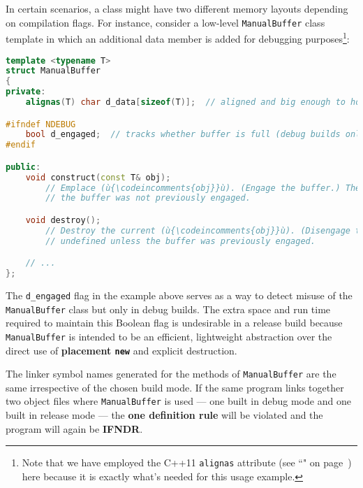 In certain scenarios, a class might have two different memory layouts
depending on compilation flags. For instance, consider a low-level
\texttt{ManualBuffer} class template in which an additional data member
is added for debugging purposes{\cprotect\footnote{Note that we have
  employed the C++11 \texttt{alignas} attribute (see ``" on page~\pageref{alignas}) here
  because it is exactly what's needed for this usage example.}}:

\begin{lstlisting}[language=C++]
template <typename T>
struct ManualBuffer
{
private:
    alignas(T) char d_data[sizeof(T)];  // aligned and big enough to hold a (ù{\codeincomments{T}}ù)

#ifndef NDEBUG
    bool d_engaged;  // tracks whether buffer is full (debug builds only)
#endif

public:
    void construct(const T& obj);
        // Emplace (ù{\codeincomments{obj}}ù). (Engage the buffer.) The behavior is undefined unless
        // the buffer was not previously engaged.

    void destroy();
        // Destroy the current (ù{\codeincomments{obj}}ù). (Disengage the buffer.) The behavior is
        // undefined unless the buffer was previously engaged.

    // ...
};
\end{lstlisting}
    
\noindent The \texttt{d\_engaged} flag in the example above serves as a way to detect misuse of
the \mbox{\texttt{ManualBuffer}} class but only in debug builds. The extra
space and run time required to maintain this Boolean flag is undesirable
in a release build because \mbox{\texttt{ManualBuffer}} is intended to be an
efficient, lightweight abstraction over the direct use of
\textbf{placement \texttt{new}} and explicit destruction.

The linker symbol names generated for the methods of
\texttt{ManualBuffer} are the same irrespective of the chosen build
mode. If the same program links together two object files where
\texttt{ManualBuffer} is used --- one built in debug mode and one built
in release mode --- the \textbf{one definition rule} will be violated
and the program will again be \textbf{IFNDR}.

